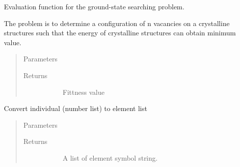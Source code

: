 \documentclass[letterpaper,10pt,english]{sphinxmanual}
\begin{document}
\begin{fulllineitems}
\begin{quote}
\begin{description}
\end{description}\end{quote}

\begin{fulllineitems}
\label{\detokenize{pygace:pygace.general_gace.GeneralApp.evalEnergy}}
Evaluation function for the ground-state searching problem.

The problem is to determine a configuration of n vacancies
on a crystalline structures such that the energy of crystalline
structures can obtain minimum value.
\begin{quote}\begin{description}
\item[{Parameters}] \leavevmode\begin{description}
\item[{}] \leavevmode
\end{description}

\item[{Returns}] \leavevmode\begin{description}
\item[{}] \leavevmode
Fittness value

\end{description}

\end{description}\end{quote}

\end{fulllineitems}


\begin{fulllineitems}
\label{\detokenize{pygace:pygace.general_gace.GeneralApp.ind_to_elis}}
Convert individual (number list) to element list
\begin{quote}\begin{description}
\item[{Parameters}] \leavevmode\begin{description}
\item[{}] \leavevmode
\end{description}

\item[{Returns}] \leavevmode\begin{description}
\item[{}] \leavevmode
A list of element symbol string.


\end{description}
\end{description}
\end{quote}
\end{fulllineitems}
\end{fulllineitems}
\end{document}
